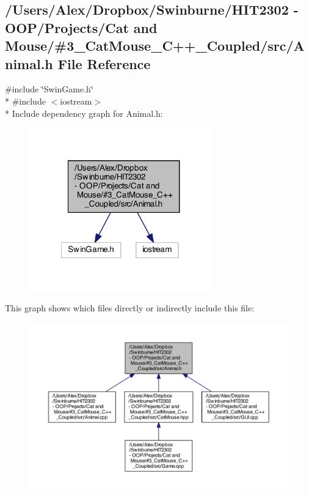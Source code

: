 \subsection{/\-Users/\-Alex/\-Dropbox/\-Swinburne/\-H\-I\-T2302 -\/ O\-O\-P/\-Projects/\-Cat and Mouse/\#3\-\_\-\-Cat\-Mouse\-\_\-\-C++\-\_\-\-Coupled/src/\-Animal.h File Reference}
\label{_animal_8h}
{\ttfamily \#include \char`\"{}Swin\-Game.\-h\char`\"{}}\\*
{\ttfamily \#include $<$iostream$>$}\\*
Include dependency graph for Animal.\-h\-:
\nopagebreak
\begin{figure}[H]
\begin{center}
\leavevmode
\includegraphics[width=224pt]{_animal_8h__incl}
\end{center}
\end{figure}
This graph shows which files directly or indirectly include this file\-:
\nopagebreak
\begin{figure}[H]
\begin{center}
\leavevmode
\includegraphics[width=350pt]{_animal_8h__dep__incl}
\end{center}
\end{figure}
